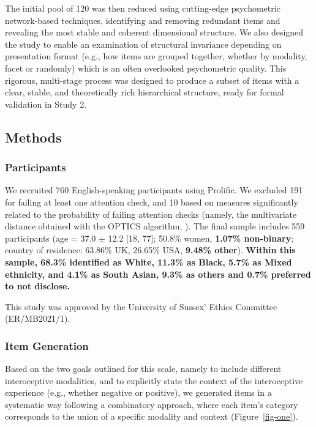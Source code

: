 \documentclass[
  man,
  floatsintext,
  longtable,
  nolmodern,
  notxfonts,
  notimes,
  mask,
  colorlinks=true,linkcolor=blue,citecolor=blue,urlcolor=blue]{apa7}
\begin{document}
The initial pool of 120 was then reduced using cutting-edge psychometric
network-based techniques, identifying and removing redundant items and
revealing the most stable and coherent dimensional structure. We also
designed the study to enable an examination of structural invariance
depending on presentation format (e.g., how items are grouped together,
whether by modality, facet or randomly) which is an often overlooked
psychometric quality. This rigorous, multi-stage process was designed to
produce a subset of items with a clear, stable, and theoretically rich
hierarchical structure, ready for formal validation in Study 2.

\subsection{Methods}\label{methods}

\subsubsection{Participants}\label{participants}

We recruited 760 English-speaking participants using
Prolific\textcopyright. We excluded 191 for failing at least one
attention check, and 10 based on measures significantly related to the
probability of failing attention checks (namely, the multivariate
distance obtained with the OPTICS algorithm,
). The final
sample includes 559 participants (age = 37.0 \(\pm\) 12.2 {[}18, 77{]};
50.8\% women, \textbf{1.07\% non-binary}; country of residence: 63.86\%
UK, 26.65\% USA, \textbf{9.48\% other}). \textbf{Within this sample,
68.3\% identified as White, 11.3\% as Black, 5.7\% as Mixed ethnicity,
and 4.1\% as South Asian, 9.3\% as others and 0.7\% preferred to not
disclose.}

This study was approved by the University of Sussex' Ethics Committee
(ER/MB2021/1).

\subsubsection{Item Generation}\label{item-generation}

Based on the two goals outlined for this scale, namely to include
different interoceptive modalities, and to explicitly state the context
of the interoceptive experience (e.g., whether negative or positive), we
generated items in a systematic way following a combinatory approach,
where each item's category corresponds to the union of a specific
modality and context (Figure~\ref{fig-one}).
\end{document}
